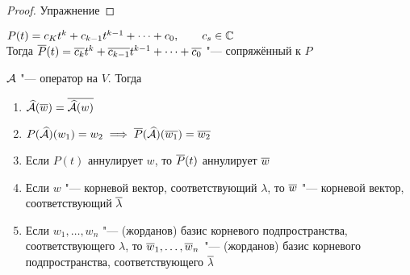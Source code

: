 \begin{proof}
	Упражнение
\end{proof}

\begin{notation}
	$ P(t) = c_Kt^k + c_{k - 1}t^{k - 1} + \dots + c_0, \qquad c_s \in \mathbb{C} $ \\
	Тогда $ \overline{P}(t) = \overline{c_k}t^k + \overline{c_{k - 1}}t^{k - 1} + \dots + \overline{c_0} $ "--- сопряжённый к $ P $
\end{notation}

\begin{lemma}
	$ \mathcal{A} $ "--- оператор на $ V $. Тогда
	\begin{enumerate}
		\item $ \widehat{\mathcal{A}}(\overline{w}) = \overline{\widehat{\mathcal{A}}(w)} $

		\item $ P(\widehat{\mathcal{A}})(w_1) = w_2 \implies \overline{P}(\widehat{\mathcal{A}})(\overline{w_1}) = \overline{w_2} $

		\item Если $ P(t) $ аннулирует $ w $, то $ \overline{P}(t) $ аннулирует $ \overline{w} $

		\item Если $ w $ "--- корневой вектор, соответствующий $ \lambda $, то $ \overline{w} $ "--- корневой вектор, соответствующий $ \overline{\lambda} $

		\item Если $ w_1, \dots, w_n $ "--- (жорданов) базис корневого подпространства, соответствующего $ \lambda $, то $ \overline{w}_1, \dots, \\
		\overline{w}_n $ "--- (жорданов) базис корневого подпространства, соответствующего $ \overline{\lambda} $ 
	\end{enumerate}
\end{lemma}

